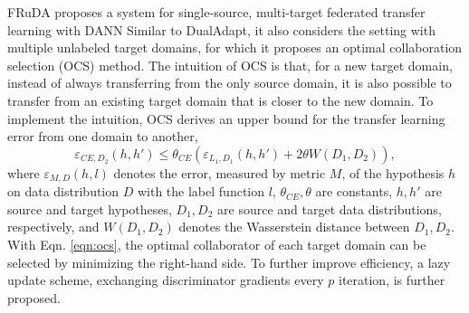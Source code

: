 \documentclass[11pt]{article}
\begin{document}
FRuDA \cite{gan2022fruda} proposes a system for single-source, multi-target federated transfer learning with DANN \cite{ganin2016domain} Similar to DualAdapt, it also considers the setting with multiple unlabeled target domains, for which it proposes an optimal collaboration selection (OCS) method. The intuition of OCS is that, for a new target domain, instead of always transferring from the only source domain, it is also possible to transfer from an existing target domain that is closer to the new domain. To implement the intuition, OCS derives an upper bound for the transfer learning error from one domain to another, 
\begin{equation}
    \varepsilon_{CE, D_2}(h, h') \le \theta_{CE}(\varepsilon_{L_1, D_1}(h, h') + 2\theta W(D_1, D_2)),
    \label{eqn:ocs}
\end{equation}
where $\varepsilon_{M, D}(h, l)$ denotes the error, measured by metric $M$, of the hypothesis $h$ on data distribution $D$ with the label function $l$, $\theta_{CE}, \theta$ are constants, $h, h'$ are source and target hypotheses, $D_1, D_2$ are source and target data distributions, respectively, and $W(D_1, D_2)$ denotes the Wasserstein distance between $D_1, D_2$. With Eqn. \ref{eqn:ocs}, the optimal collaborator of each target domain can be selected by minimizing the right-hand side. To further improve efficiency, a lazy update scheme, exchanging discriminator gradients every $p$ iteration, is further proposed. 
\end{document}
